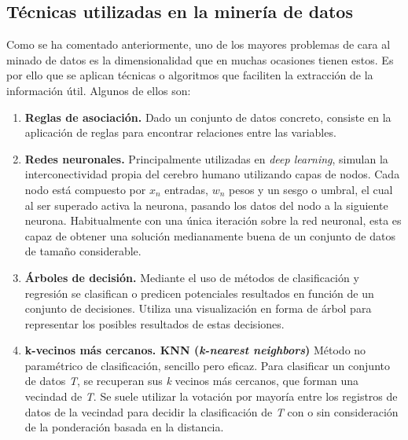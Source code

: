\subsection{Técnicas utilizadas en la minería de datos}
Como se ha comentado anteriormente, uno de los mayores problemas de cara al minado de datos es la dimensionalidad que en muchas ocasiones tienen estos. Es por ello que se aplican técnicas o algoritmos que faciliten la extracción de la información útil. Algunos de ellos son:
\begin{enumerate}
	\item \textbf{Reglas de asociación.} Dado un conjunto de datos concreto, consiste en la aplicación de reglas para encontrar relaciones entre las variables.
	\item \textbf{Redes neuronales.} Principalmente utilizadas en \textit{deep learning}, simulan la interconectividad propia del cerebro humano utilizando capas de nodos. Cada nodo está compuesto por \(x_n\) entradas, \(w_n\) pesos y un sesgo o umbral, el cual al ser superado activa la neurona, pasando los datos del nodo a la siguiente neurona. Habitualmente con una única iteración sobre la red neuronal, esta es capaz de obtener una solución medianamente buena de un conjunto de datos de tamaño considerable. 
	\item \textbf{Árboles de decisión.} Mediante el uso de métodos de clasificación y regresión se clasifican o predicen potenciales resultados en función de un conjunto de decisiones. Utiliza una visualización en forma de árbol para representar los posibles resultados de estas decisiones.
	\item \textbf{k-vecinos más cercanos. KNN (\textit{k-nearest neighbors})} Método no paramétrico de clasificación, sencillo pero eficaz. Para clasificar un conjunto de datos \textit{T}, se recuperan sus \textit{k} vecinos más cercanos, que forman una vecindad de \textit{T}. Se suele utilizar la votación por mayoría entre los registros de datos de la vecindad para decidir la clasificación de \textit{T} con o sin consideración de la ponderación basada en la distancia.
\end{enumerate}